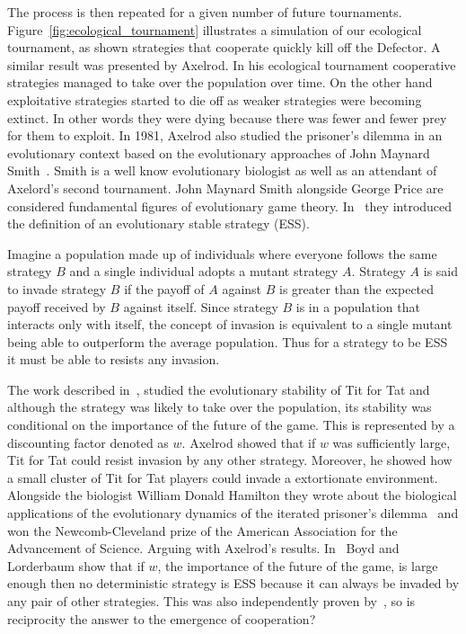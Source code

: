 \documentclass{article}
\theoremstyle{definition}
\begin{document}
The process is then repeated for a given number of future tournaments.
Figure~\ref{fig:ecological_tournament} illustrates a simulation of our
ecological tournament, as shown strategies that cooperate quickly kill off the Defector.
A similar result was presented by Axelrod. In his ecological tournament cooperative
strategies managed to take over the population over time. On the other hand exploitative
strategies started to die off as weaker strategies were becoming extinct. In other
words they were dying because there was fewer and fewer prey for them to exploit.
In 1981, Axelrod also studied the prisoner's dilemma in an evolutionary context based
on the evolutionary approaches of John Maynard Smith~\cite{Smith1973,
Smith1974, Smith1979}. Smith is a well know evolutionary biologist as well
as an attendant of Axelord's second tournament. John Maynard Smith alongside George Price
are considered fundamental figures of evolutionary game theory. In~\cite{Smith1973}
they introduced the definition of an evolutionary stable strategy (ESS).

Imagine a population made up of individuals where everyone follows the
same strategy \(B\) and a single individual adopts a mutant strategy \(A\).
Strategy \(A\) is said to invade strategy \(B\) if the payoff of \(A\) against \(B\)
is greater than the expected payoff received by \(B\) against itself.
Since strategy \(B\) is in a population that interacts only with itself,
the concept of invasion is equivalent to a single mutant being able to outperform
the average population. Thus for a strategy to be ESS it must be able to resists
any invasion.

The work described in~\cite{axelrod1981}, studied the evolutionary stability of
Tit for Tat and although the strategy was likely to take over the population, its
stability was conditional on the importance of the future of the game. This is
represented by a discounting factor denoted as \(w\). Axelrod showed that if \(w\)
was sufficiently large, Tit for Tat could resist invasion by any other strategy.
Moreover, he showed how a small cluster of Tit for Tat players could invade a extortionate
environment.
Alongside the biologist William Donald Hamilton they wrote about the biological applications
of the evolutionary dynamics of the iterated prisoner's dilemma~\cite{Axelrod1984}
and won the Newcomb-Cleveland prize of the American Association for the Advancement
of Science. Arguing with Axelrod's results.
In~\cite{Boyd1987} Boyd and Lorderbaum show that if \(w\), the importance of the
future of the game, is large enough then no deterministic strategy is ESS because
it can always be invaded by any pair of other strategies. This was also independently
proven by~\cite{Pudaite1987}, so is reciprocity the answer to the emergence of
cooperation?
\end{document}
